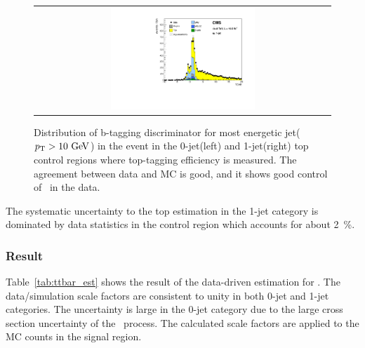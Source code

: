 \begin{figure}[htp]
\begin{tabular}{c}
\includegraphics[width=0.5\textwidth]{figures/topcontrol_tche_of_1j.pdf} 
\end{tabular} 
\caption{Distribution of b-tagging discriminator for most energetic jet($p_\mathrm{T}>10~\mathrm{Ge\kern -0.1em V}$) 
in the event in the 0-jet(left) and 1-jet(right) top control regions
where top-tagging efficiency is measured. The agreement between data and MC is good, 
and it shows good control of \topbkg\ in the data.} 
\label{fig:TCHE_topCR} 
\end{figure} 

The systematic uncertainty to the top estimation in the 1-jet category 
is dominated by data statistics in the control region which accounts for 
about 2~\%.     

\subsubsection{Result}

Table~\ref{tab:ttbar_est} shows the result of the data-driven estimation for \topbkg. 
The data/simulation scale factors are consistent to unity in both 0-jet and 1-jet categories. 
The uncertainty is large in the 0-jet category due to the large cross section uncertainty 
of the \tw\ process. The calculated scale factors are applied to the MC counts 
in the signal region.

